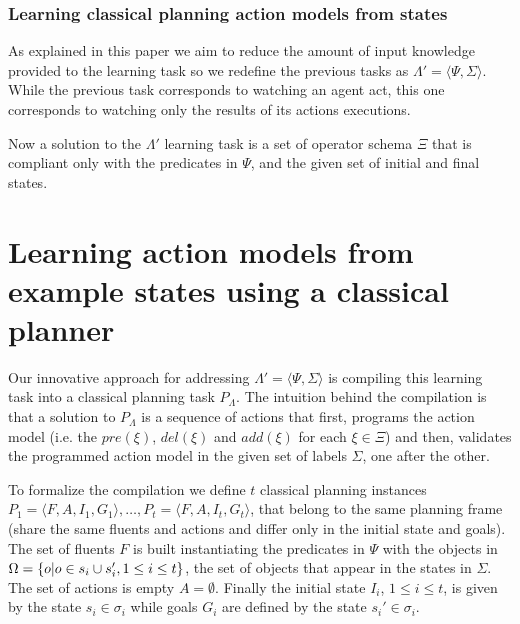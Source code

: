 \documentclass[letterpaper]{article} %
\newcommand{\tup}[1]{{\langle #1 \rangle}}
\begin{document}
\subsubsection{Learning classical planning action models from states}
As explained in this paper we aim to reduce the amount of input knowledge provided to the learning task so we redefine the previous tasks as $\Lambda'=\tup{\Psi,\Sigma}$. While the previous task corresponds to watching an agent act, this one corresponds to watching only the results of its actions executions.

Now a solution to the $\Lambda'$ learning task is a set of operator schema $\Xi$ that is compliant only with the predicates in $\Psi$, and the given set of initial and final states.


\section{Learning action models from example states using a classical planner}
Our innovative approach for addressing $\Lambda'=\tup{\Psi,\Sigma}$ is compiling this learning task into a classical planning task $P_{\Lambda}$. The intuition behind the compilation is that a solution to $P_{\Lambda}$ is a sequence of actions that first, programs the action model (i.e. the $pre(\xi)$, $del(\xi)$ and $add(\xi)$ for each $\xi\in\Xi$) and then, validates the programmed action model in the given set of labels $\Sigma$, one after the other.

To formalize the compilation we define $t$ classical planning instances $P_1=\tup{F,A,I_1,G_1},\ldots,P_t=\tup{F,A,I_t,G_t}$, that belong to the same planning frame (share the same fluents and actions and differ only in the initial state and goals). The set of fluents $F$ is built instantiating the predicates in $\Psi$ with the objects in $\Omega=\{o|o\in s_i\cup s_i', {\small 1\leq i\leq t}\}$, the set of objects that appear in the states in $\Sigma$. The set of actions is empty $A=\emptyset$. Finally the initial state $I_i$, {\small $1\leq i\leq t$}, is given by the state $s_i\in \sigma_i$ while goals $G_i$ are defined by the state $s_i'\in \sigma_i$. 
\end{document}
